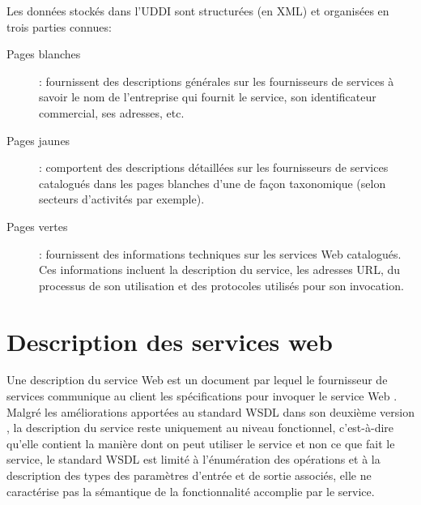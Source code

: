 
  Les données stockés dans l'\textsc{UDDI} sont structurées (en
  \textsc{XML}) et organisées en trois parties connues:

  \SpecialItem
  \begin{description}
    \item[Pages blanches]: fournissent des descriptions générales sur
      les fournisseurs de services à savoir le nom de l'entreprise qui
      fournit le service, son identificateur commercial, ses adresses,
      etc.

    \item[Pages jaunes]: comportent des descriptions détaillées sur
      les fournisseurs de services catalogués dans les pages blanches
      d'une de façon taxonomique (selon secteurs d'activités par
      exemple).

    \item[Pages vertes]: fournissent des informations techniques sur
      les services Web catalogués. Ces informations incluent la
      description du service, les adresses \textsc{URL}, du processus
      de son utilisation et des protocoles utilisés pour son
      invocation.
  \end{description}



\section{Description des services web}
\label{sec:ws-description}


Une description du service Web est un document par lequel le
fournisseur de services communique au client les spécifications pour
invoquer le service Web \cite{lopez2008selection}. Malgré les
améliorations apportées au standard \textsc{WSDL} dans son deuxième
version \cite{chinnici2007web}, la description du service reste
uniquement au niveau fonctionnel, c'est-à-dire qu'elle contient la
manière dont on peut utiliser le service et non ce que fait le
service, le standard \textsc{WSDL} est limité à l'énumération des
opérations et à la description des types des paramètres d'entrée et de
sortie associés, elle ne caractérise pas la sémantique de la
fonctionnalité accomplie par le service.

